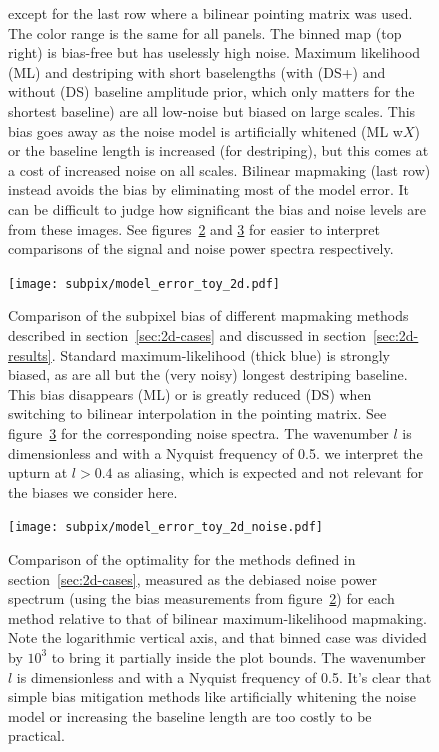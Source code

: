 \documentclass{aa}
\begin{document}
\begin{figure}
{		except for the last row where a bilinear pointing matrix was used.
		The color range is the same for all panels.
		The binned map (top right) is bias-free but has uselessly high noise. Maximum likelihood (ML)
		and destriping with short baselengths (with (DS+) and without (DS) baseline amplitude prior,
		which only matters for the shortest baseline)
		are all low-noise but biased on large scales. This bias goes away as the noise model
		is artificially whitened (ML w$X$) or the baseline length is increased (for destriping),
		but this comes at a cost of increased noise on all scales.
		Bilinear mapmaking (last row) instead avoids the bias by eliminating most of the model error.
		It can be difficult to judge how significant the bias and noise levels are from
		these images. See figures~\ref{fig:2d-bias} and \ref{fig:2d-noise} for easier to
		interpret comparisons of the signal and noise power spectra respectively.
	}
	\label{fig:2d-maps}
\end{figure}

\begin{figure}
	\centering
	\hspace*{-5mm}\texttt{[image: subpix/model\_error\_toy\_2d.pdf]}
	\caption{
		Comparison of the subpixel bias of different mapmaking methods
		described in section~\ref{sec:2d-cases} and discussed in section~\ref{sec:2d-results}.
		Standard maximum-likelihood (thick blue) is strongly biased, as are all but
		the (very noisy) longest destriping baseline. This bias disappears (ML)
		or is greatly reduced (DS) when switching to bilinear interpolation in the pointing matrix.
		See figure~\ref{fig:2d-noise} for the corresponding noise spectra.
		The wavenumber $l$ is dimensionless and with a Nyquist frequency of 0.5.
		we interpret the upturn at $l>0.4$ as aliasing, which
		is expected and not relevant for the biases we consider here.
	}
	\label{fig:2d-bias}
\end{figure}

\begin{figure}[h!]
	\centering
	\hspace*{-5mm}\texttt{[image: subpix/model\_error\_toy\_2d\_noise.pdf]}
	\caption{
		Comparison of the optimality for the methods defined in section~\ref{sec:2d-cases}, measured
		as the debiased noise power spectrum (using the bias measurements from figure~\ref{fig:2d-bias})
		for each method relative to that of bilinear maximum-likelihood mapmaking.
		Note the logarithmic vertical axis, and that binned case was divided by $10^3$
		to bring it partially inside the plot bounds.
		The wavenumber $l$ is dimensionless and with a Nyquist frequency of 0.5.
		It's clear that simple bias mitigation
		methods like artificially whitening the noise model or increasing the
		baseline length are too costly to be practical.
	}
	\label{fig:2d-noise}
\end{figure}
\end{document}
